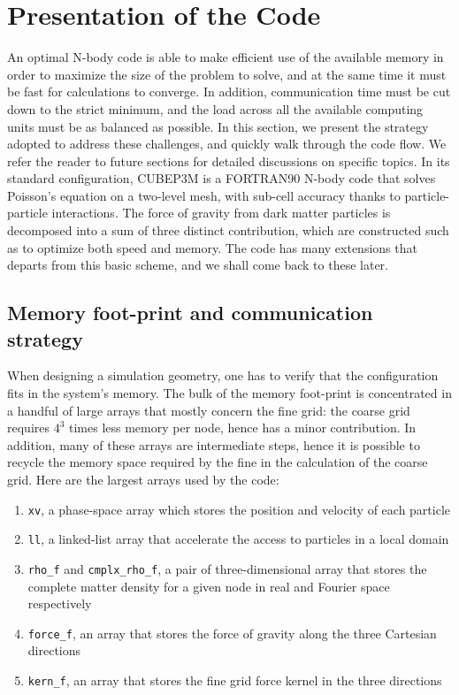 
\section{Presentation of the Code}
\label{sec:presentation}



An optimal N-body code is able to make efficient use of the available memory in order to maximize the size of the problem to solve,
and at the same time it must be fast for calculations to converge. In addition, communication time must be cut down to the strict minimum, 
and the load across all the available computing units must be as balanced as possible. 
In this section, we present the strategy adopted to address these challenges, and quickly walk through the code flow.
We refer the reader to future sections for detailed discussions on specific topics.
In its standard configuration, {\small CUBEP3M} is a {\small FORTRAN90} N-body code that solves Poisson's equation on a two-level mesh, 
with sub-cell accuracy thanks to particle-particle interactions. The force of gravity from dark matter particles is decomposed into a sum of three distinct contribution,
which are constructed such as to optimize both speed and memory. The code has many extensions that departs from this basic scheme, and
we shall come back to these later. 

\subsection{Memory foot-print and communication strategy}
\label{subsec:memory}
When designing a simulation geometry, one has to verify that the configuration fits in the system's memory.
The bulk of the memory foot-print is concentrated in a handful of large arrays that mostly concern the fine grid:
the coarse grid requires $4^3$ times less memory per node, hence has a minor contribution. 
In addition, many of these arrays are intermediate steps, hence it is possible to recycle the memory space required by the fine 
in the calculation of the coarse grid.  
Here are the largest  arrays used by the code:
\begin{enumerate}
\item{{\tt xv}, a phase-space array which stores the position and velocity of each particle} 
\item{{\tt ll}, a linked-list array that accelerate the access to particles in a local domain}
\item{{\tt rho\_f} and {\tt cmplx\_rho\_f}, a pair of three-dimensional array that stores 
the complete matter density for a given node in real and Fourier space respectively}
\item{{\tt force\_f}, an array that stores the force of gravity along the three Cartesian directions}
\item{{\tt kern\_f}, an array that stores the fine grid force kernel in the three directions}
\end{enumerate}

